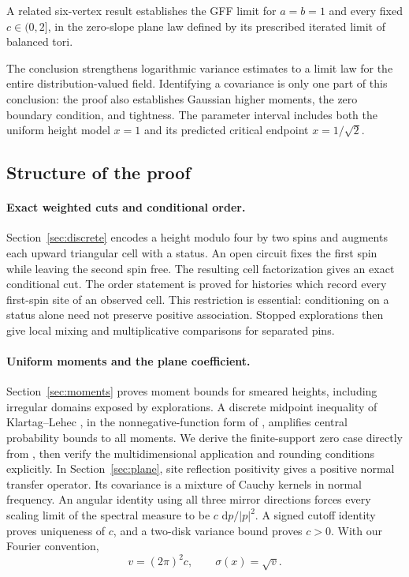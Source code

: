 \documentclass[11pt]{article}
\theoremstyle{definition}
\theoremstyle{remark}
\numberwithin{equation}{section}
\begin{document}
A related six-vertex result \cite[Theorem~1.1]{BalancedSixVertexGFF2026}
establishes the GFF limit for $a=b=1$ and every fixed $c\in(0,2]$, in the
zero-slope plane law defined by its prescribed iterated limit of balanced tori.

The conclusion strengthens logarithmic variance estimates to a limit
law for the entire distribution-valued field.  Identifying a covariance
is only one part of this conclusion: the proof also establishes Gaussian
higher moments, the zero boundary condition, and tightness.  The parameter
interval includes both the uniform height model $x=1$ and its predicted
critical endpoint $x=1/\sqrt2$.

\subsection{Structure of the proof}

\paragraph{Exact weighted cuts and conditional order.}
Section~\ref{sec:discrete} encodes a height modulo four by two spins and
augments each upward triangular cell with a status.  An open circuit fixes
the first spin while leaving the second spin free.  The resulting cell
factorization gives an exact conditional cut.  The order statement is
proved for histories which record every first-spin site of an observed
cell.  This restriction is essential: conditioning on a status alone need
not preserve positive association.  Stopped explorations then give local
mixing and multiplicative comparisons for separated pins.

\paragraph{Uniform moments and the plane coefficient.}
Section~\ref{sec:moments} proves moment bounds for smeared heights,
including irregular domains exposed by explorations.  A discrete midpoint
inequality of Klartag--Lehec \cite[Theorem~1.4]{KlartagLehec2019}, in the
nonnegative-function form of \cite[Theorem~3]{GRST2019}, amplifies central
probability bounds to all moments.  We derive the finite-support zero
case directly from \cite[Theorem~8]{GRST2019}, then verify the
multidimensional application and rounding conditions explicitly.
In Section~\ref{sec:plane},
site reflection positivity gives a positive normal transfer operator.
Its covariance is a mixture of Cauchy kernels in normal frequency.
An angular identity using all three mirror directions forces every
scaling limit of the spectral measure to be $c\,\,\mathrm d p/|p|^2$.
A signed cutoff identity proves uniqueness of $c$, and a two-disk variance
bound proves $c>0$.  With our Fourier convention,
\begin{equation}\label{eq:normalization}
 v=(2\pi)^2c,\qquad \sigma(x)=\sqrt v.
\end{equation}
\end{document}
